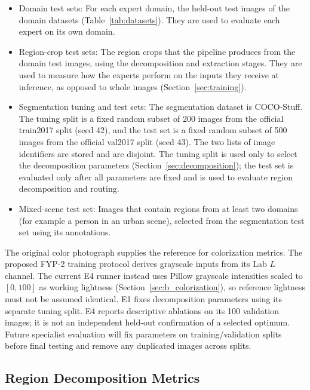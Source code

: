 \documentclass{FastFyp}
\begin{document}
\begin{itemize}
    \item Domain test sets: For each expert domain, the held-out test images of the domain datasets (Table~\ref{tab:datasets}). They are used to evaluate each expert on its own domain.
    \item Region-crop test sets: The region crops that the pipeline produces from the domain test images, using the decomposition and extraction stages. They are used to measure how the experts perform on the inputs they receive at inference, as opposed to whole images (Section~\ref{sec:training}).
    \item Segmentation tuning and test sets: The segmentation dataset is COCO-Stuff. The tuning split is a fixed random subset of 200 images from the official train2017 split (seed 42), and the test set is a fixed random subset of 500 images from the official val2017 split (seed 43). The two lists of image identifiers are stored and are disjoint. The tuning split is used only to select the decomposition parameters (Section~\ref{sec:decomposition}); the test set is evaluated only after all parameters are fixed and is used to evaluate region decomposition and routing.
    \item Mixed-scene test set: Images that contain regions from at least two domains (for example a person in an urban scene), selected from the segmentation test set using its annotations.
\end{itemize}

The original color photograph supplies the reference for colorization metrics. The proposed FYP-2 training protocol derives grayscale inputs from its Lab $L$ channel. The current E4 runner instead uses Pillow grayscale intensities scaled to $[0,100]$ as working lightness (Section~\ref{sec:b_colorization}), so reference lightness must not be assumed identical. E1 fixes decomposition parameters using its separate tuning split. E4 reports descriptive ablations on its 100 validation images; it is not an independent held-out confirmation of a selected optimum. Future specialist evaluation will fix parameters on training/validation splits before final testing and remove any duplicated images across splits.

\subsection{Region Decomposition Metrics}
\end{document}
